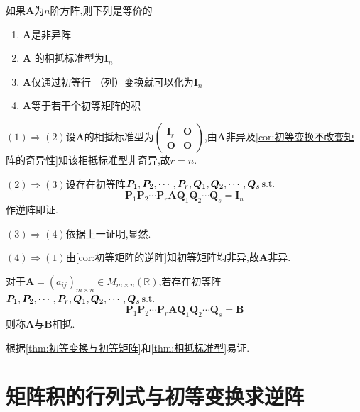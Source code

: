     \begin{formal}
    \begin{proposition}[方阵的若干等价结论]\label{prop:方阵的若干等价结论}
如果$\bm{A}$为$n$阶方阵,则下列是等价的
\begin{enumerate}[label=\textup{(\arabic*)}]
    \item $\bm{A}$是非异阵
    \item $\bm{A}$ 的相抵标准型为$\bm{I}_n$
    \item $\bm{A}$仅通过初等行
    （列）变换就可以化为$\bm{I}_n$
    \item $\bm{A}$等于若干个初等矩阵的积
\end{enumerate}
    \end{proposition}
    \begin{Proof}
        $(1)\Longrightarrow (2)$设$\bm{A}$的相抵标准型为$\begin{pmatrix}
            \bm{I}_r & \bm{O} \\
            \bm{O} & \bm{O}
        \end{pmatrix}$,由$\bm{A}$非异及\cref{cor:初等变换不改变矩阵的奇异性}知该相抵标准型非奇异,故$r=n$.

        $(2)\Longrightarrow (3)$设存在初等阵$\bm{P}_1,\bm{P}_2,\cdots,\bm{P}_r,\bm{Q}_1,\bm{Q}_2,\cdots,\bm{Q}_s\,\textup{s.t.}$
        \[
        \bm{P}_1\bm{P}_2\cdots\bm{P}_r\bm{A}\bm{Q}_1\bm{Q}_2\cdots\bm{Q}_s=\bm{I}_n
        \]作逆阵即证.

        $(3)\Longrightarrow (4)$依据上一证明,显然.

        $(4)\Longrightarrow (1)$由\cref{cor:初等矩阵的逆阵}知初等矩阵均非异,故$\bm{A}$非异.
    \end{Proof}
    \end{formal}
    \begin{green}
    \begin{corollary}[相抵的等价表述]\label{cor:相抵的等价表述}
        对于$\bm{A}=\left(a_{ij}\right)_{m\times n}\in M_{m\times n}\left(\mathbb{R}\right)$,若存在初等阵$\bm{P}_1,\bm{P}_2,\cdots,\bm{P}_r,\bm{Q}_1,\bm{Q}_2,\cdots,\bm{Q}_s\,\textup{s.t.}$
        \[
        \bm{P}_1\bm{P}_2\cdots\bm{P}_r\bm{A}\bm{Q}_1\bm{Q}_2\cdots\bm{Q}_s=\bm{B}
        \]则称$\bm{A}$与$\bm{B}$相抵.
    \end{corollary}
    \begin{Proof}
    根据\cref{thm:初等变换与初等矩阵}和\cref{thm:相抵标准型}易证.
    \end{Proof}
    \end{green}
\newpage
\section{矩阵积的行列式与初等变换求逆阵}
